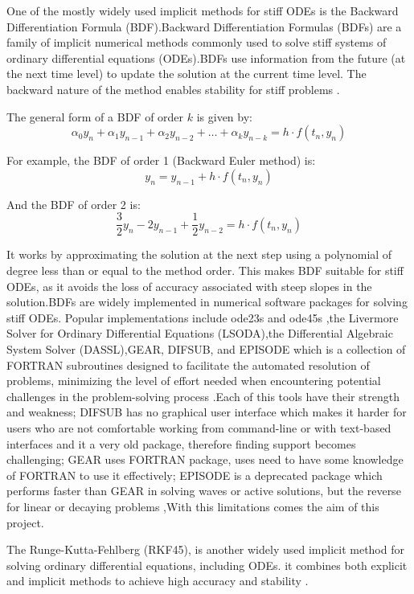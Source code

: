 \documentclass{report}
\begin{document}
One of the mostly widely used implicit methods for stiff ODEs is the Backward Differentiation Formula (BDF).Backward Differentiation Formulas (BDFs) are a family of implicit numerical methods commonly used to solve stiff systems of ordinary differential equations (ODEs).BDFs use information from the future (at the next time level) to update the solution at the current time level. The backward nature of the method enables stability for stiff problems \cite{numericalrecipes}.

The general form of a BDF of order \(k\) is given by:
\[
\alpha_0 y_n + \alpha_1 y_{n-1} + \alpha_2 y_{n-2} + \ldots + \alpha_k y_{n-k} = h \cdot f(t_n, y_n)
\]

For example, the BDF of order 1 (Backward Euler method) is:
\[
y_n = y_{n-1} + h \cdot f(t_n, y_n)
\]

And the BDF of order 2 is:
\[
\frac{3}{2} y_n - 2y_{n-1} + \frac{1}{2} y_{n-2} = h \cdot f(t_n, y_n)
\]

It works by approximating the solution at the next step using a polynomial of degree less than or equal to the method order. This makes BDF suitable for stiff ODEs, as it avoids the loss of accuracy associated with steep slopes in the solution.BDFs are widely implemented in numerical software packages for solving stiff ODEs. Popular implementations include ode23s and ode45s \cite{shampine1997matlab},the Livermore Solver for Ordinary Differential Equations (LSODA),the Differential Algebraic System Solver (DASSL),GEAR, DIFSUB, and EPISODE \cite{Yatim2013} which is a collection of FORTRAN subroutines designed to facilitate the automated resolution of problems, minimizing the level of effort needed when encountering potential challenges in the problem-solving process \cite{thohura2013numerical}.Each of this tools have their strength and weakness; DIFSUB has no graphical user interface which makes it harder for users who are not comfortable working from command-line or with text-based interfaces and it a very old package, therefore finding support becomes challenging; GEAR uses FORTRAN package, uses need to have some knowledge of FORTRAN to use it effectively; EPISODE is a deprecated package which performs faster than GEAR in solving waves or active solutions, but the reverse for linear or decaying problems \cite{BYRNE1977125},With this limitations comes the aim of this project.

The Runge-Kutta-Fehlberg (RKF45), is another widely used implicit method for solving ordinary differential equations, including ODEs. it combines both explicit and implicit methods to achieve high accuracy and stability \cite{stone2017accelerating}.
\end{document}
